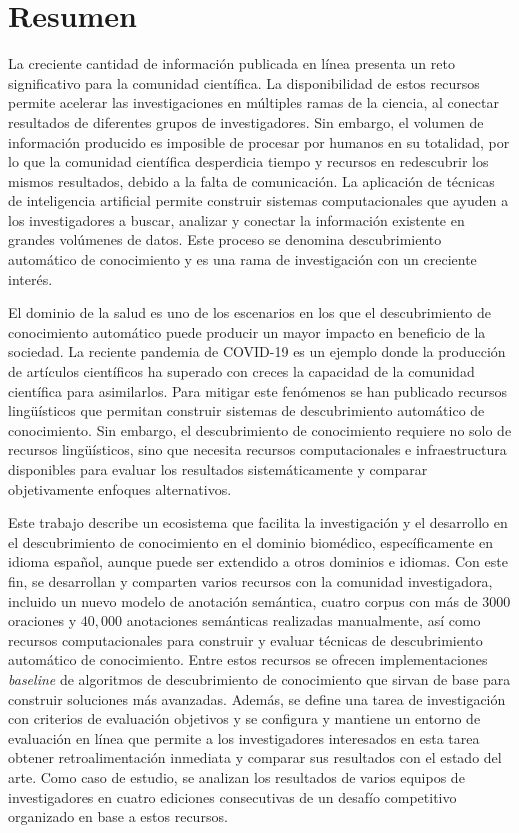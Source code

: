 \chapter*{Resumen}

La creciente cantidad de información publicada en línea presenta un reto significativo para la comunidad científica. La disponibilidad de estos recursos permite acelerar las investigaciones en múltiples ramas de la ciencia, al conectar resultados de diferentes grupos de investigadores. Sin embargo, el volumen de información producido es imposible de procesar por humanos en su totalidad, por lo que la comunidad científica desperdicia tiempo y recursos en redescubrir los mismos resultados, debido a la falta de comunicación. La aplicación de técnicas de inteligencia artificial permite construir sistemas computacionales que ayuden a los investigadores a buscar, analizar y conectar la información existente en grandes volúmenes de datos. Este proceso se denomina descubrimiento automático de conocimiento y es una rama de investigación con un creciente interés.

El dominio de la salud es uno de los escenarios en los que el descubrimiento de conocimiento automático puede  producir un mayor impacto en beneficio de la sociedad. La reciente pandemia de COVID-19 es un ejemplo donde la producción de artículos científicos ha superado con creces la capacidad de la comunidad científica para asimilarlos. Para mitigar este fenómenos se han publicado recursos lingüísticos que permitan construir sistemas de descubrimiento automático de conocimiento.
Sin embargo, el descubrimiento de conocimiento requiere no solo de recursos lingüísticos, sino que necesita recursos computacionales e infraestructura disponibles para evaluar los resultados sistemáticamente y comparar objetivamente enfoques alternativos.

Este trabajo describe un ecosistema que facilita la investigación y el desarrollo en el descubrimiento de conocimiento en el dominio biomédico, específicamente en idioma español, aunque puede ser extendido a otros dominios e idiomas. Con este fin, se desarrollan y comparten varios recursos con la comunidad investigadora, incluido un nuevo modelo de anotación semántica, cuatro corpus con más de $3000$ oraciones y $40,000$ anotaciones semánticas realizadas manualmente, así como recursos computacionales para construir y evaluar técnicas de descubrimiento automático de conocimiento.
Entre estos recursos se ofrecen implementaciones \textit{baseline} de algoritmos de descubrimiento de conocimiento que sirvan de base para construir soluciones más avanzadas.
Además, se define una tarea de investigación con criterios de evaluación objetivos y se configura y mantiene un entorno de evaluación en línea que permite a los investigadores interesados en esta tarea obtener retroalimentación inmediata y comparar sus resultados con el estado del arte.
Como caso de estudio, se analizan los resultados de varios equipos de investigadores en cuatro ediciones consecutivas de un desafío competitivo organizado en base a estos recursos.

